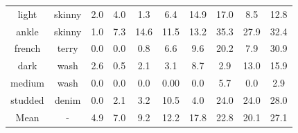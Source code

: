 \begin{table}[h]
{\begin{tabular}{|cc|cc|cc|cc|cc|}
light      & skinny     & 2.0  & 4.0 & 1.3  & 6.4 & 14.9 & 17.0 & 8.5  & 12.8 \\ 
ankle      & skinny     & 1.0  & 7.3 & 14.6 & 11.5 & 13.2 & 35.3 & 27.9 & 32.4 \\ 
french     & terry      & 0.0  & 0.0 & 0.8  & 6.6 & 9.6  & 20.2 & 7.9  & 30.9 \\ 
dark       & wash       & 2.6  & 0.5 & 2.1  & 3.1 & 8.7  & 2.9 & 13.0 & 15.9 \\ 
medium     & wash       & 0.0  & 0.0 & 0.0  & 0.00 & 0.0  & 5.7 & 0.0  & 2.9 \\ 
studded    & denim      & 0.0  & 2.1 & 3.2  & 10.5 & 4.0  & 24.0 & 24.0 &  28.0 \\ 
\hline
 Mean & - & 4.9 & 7.0 & 9.2 & 12.2 & 17.8 & 22.8 & 20.1 & 27.1 \\ 
\hline
\end{tabular}
}
\end{table}

